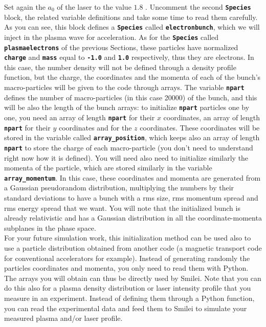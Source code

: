 \documentclass[a4paper,12pt]{extarticle}
\newcommand{\smilei}{{\sc Smilei}\xspace}
\newcommand{\commandline}[1]{\texttt{\textbf{#1}}}
\begin{document}
Set again the $a_0$ of the laser to  the value $1.8$ . Uncomment the second \commandline{Species} block, the related variable definitions and take some time to read them carefully. As you can see, this block defines a \commandline{Species} called \commandline{electronbunch}, which we will inject in the plasma wave for acceleration. As for the \commandline{Species} called \commandline{plasmaelectrons} of the previous  Sections, these particles have normalized \commandline{charge} and \commandline{mass} equal to \commandline{-1.0} and \commandline{1.0} respectively, thus they are electrons. In this case,  the number density will not be defined through a density profile function, but the charge, the coordinates and the momenta of each of the bunch's macro-particles will be given to the code through arrays. The variable \commandline{npart} defines the number of macro-particles (in  this case 20000) of the bunch, and this will be also the length of the bunch arrays: to initialize \commandline{npart} particles one by one, you need an array of length \commandline{npart} for their $x$ coordinates, an array of length \commandline{npart} for their $y$ coordinates and for the $z$ coordinates. These coordinates will be stored in the variable called \commandline{array\_position}, which keeps also an array of length \commandline{npart} to store the charge of each macro-particle (you don't need to understand right now how it is defined). You will need also need to initialize similarly the momenta of the particle, which are stored similarly in the variable \commandline{array\_momentum}. In this case, these coordinates and momenta are generated from a Gaussian pseudorandom distribution, multiplying the numbers by their standard deviations to have a bunch with a rms size, rms momentum spread and rms energy spread that we want. You will note that the initialized bunch is already relativistic and has a Gaussian distribution in all the coordinate-momenta subplanes in the phase space.\\

For your future  simulation work, this initialization method can be used also to use a particle distribution obtained from another code (a magnetic transport code for conventional accelerators for example). Instead of generating randomly the particles coordinates and momenta, you only need to read them with Python. The arrays you will obtain can thus be directly used by \smilei. Note that you can do this also for a plasma density distribution or laser intensity profile that you measure in an experiment. Instead of defining them through a Python function, you  can read the experimental data and feed them to \smilei to simulate your measured plasma and/or laser profile.\\
\end{document}
